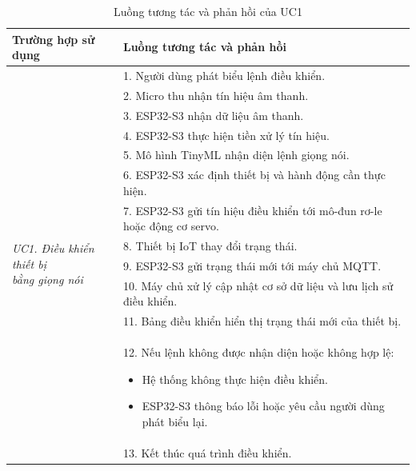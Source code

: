 \documentclass[a4paper,12pt]{article}
\begin{document}
\begin{table}[H]
\centering
\small
\caption{Luồng tương tác và phản hồi của UC1}
\begin{tabularx}{\linewidth}{|p{3.5cm}|X|}
\hline
\textbf{Trường hợp sử dụng} &
\textbf{Luồng tương tác và phản hồi} \\
\hline

\multirow{13}{=}{\parbox{3.2cm}{\centering\textit{UC1. Điều khiển thiết bị\\bằng giọng nói}}}
&
1. Người dùng phát biểu lệnh điều khiển.\\

&2. Micro thu nhận tín hiệu âm thanh.\\

&3. ESP32-S3 nhận dữ liệu âm thanh.\\

&4. ESP32-S3 thực hiện tiền xử lý tín hiệu.\\

&5. Mô hình TinyML nhận diện lệnh giọng nói.\\

&6. ESP32-S3 xác định thiết bị và hành động cần thực hiện.\\

&7. ESP32-S3 gửi tín hiệu điều khiển tới mô-đun rơ-le hoặc động cơ servo.\\

&8. Thiết bị IoT thay đổi trạng thái.\\

&9. ESP32-S3 gửi trạng thái mới tới máy chủ MQTT.\\

&10. Máy chủ xử lý cập nhật cơ sở dữ liệu và lưu lịch sử điều khiển.\\

&11. Bảng điều khiển hiển thị trạng thái mới của thiết bị.\\

&12. Nếu lệnh không được nhận diện hoặc không hợp lệ:
\begin{itemize}
\item Hệ thống không thực hiện điều khiển.
\item ESP32-S3 thông báo lỗi hoặc yêu cầu người dùng phát biểu lại.
\end{itemize}
\\

&13. Kết thúc quá trình điều khiển.\\
\hline

\end{tabularx}
\end{table}
\end{document}
